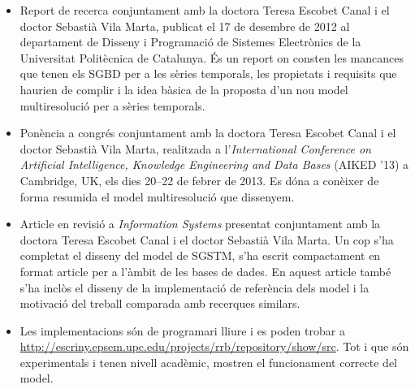 \begin{itemize}

\item Report de recerca \parencite{llusa12:report} conjuntament amb la
  doctora Teresa Escobet Canal i el doctor Sebastià Vila Marta,
  publicat el 17 de desembre de 2012 al departament de Disseny i
  Programació de Sistemes Electrònics de la Universitat Politècnica de
  Catalunya. És un report on consten les mancances que tenen els
  \gls{SGBD} per a les sèries temporals, les propietats i requisits
  que haurien de complir i la idea bàsica de la proposta d'un nou
  model multiresolució per a sèries temporals.

\item Ponència a congrés \parencite{llusa13:aiked} conjuntament amb la
  doctora Teresa Escobet Canal i el doctor Sebastià Vila Marta, realitzada
  a l'\emph{International Conference on Artificial Intelligence, Knowledge
  Engineering and Data Bases} (AIKED '13) a Cambridge, UK, els dies
  20--22 de febrer de 2013.  Es dóna a conèixer de forma resumida el
  model multiresolució que dissenyem.


\item Article en revisió a \emph{Information Systems} presentat
  conjuntament amb la doctora Teresa Escobet Canal i el doctor
  Sebastià Vila Marta. Un cop s'ha completat el disseny del model de
  \gls{SGSTM}, s'ha escrit compactament en format article per a
  l'àmbit de les bases de dades.  En aquest article també s'ha inclòs
  el disseny de la implementació de referència dels model i la
  motivació del treball comparada amb recerques similars.

\item Les implementacions són de programari lliure i es poden trobar a
  \url{http://escriny.epsem.upc.edu/projects/rrb/repository/show/src}. Tot
  i que són experimentals i tenen nivell acadèmic, mostren el
  funcionament correcte del model.

\end{itemize}






